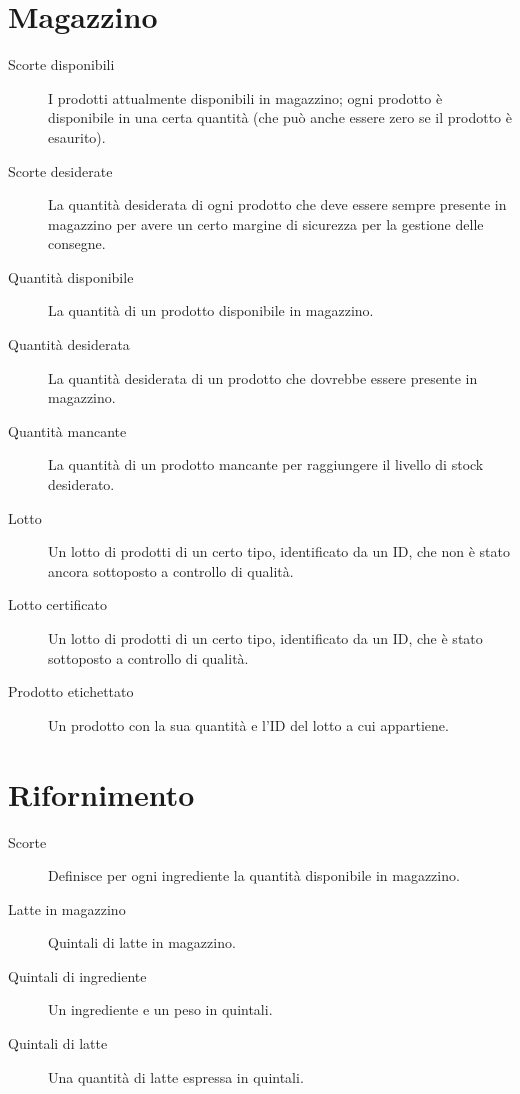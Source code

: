 \section{Magazzino}
\begin{description}
    \item [Scorte disponibili] I prodotti attualmente disponibili in magazzino; ogni prodotto è disponibile in una certa quantità (che può anche essere zero se il prodotto è esaurito).
    \item [Scorte desiderate] La quantità desiderata di ogni prodotto che deve essere sempre presente in magazzino per avere un certo margine di sicurezza per la gestione delle consegne.
    \item [Quantità disponibile] La quantità di un prodotto disponibile in magazzino.
    \item [Quantità desiderata] La quantità desiderata di un prodotto che dovrebbe essere presente in magazzino.
    \item [Quantità mancante] La quantità di un prodotto mancante per raggiungere il livello di stock desiderato.
    \item [Lotto] Un lotto di prodotti di un certo tipo, identificato da un ID, che non è stato ancora sottoposto a controllo di qualità.
    \item [Lotto certificato] Un lotto di prodotti di un certo tipo, identificato da un ID, che è stato sottoposto a controllo di qualità.
    \item [Prodotto etichettato] Un prodotto con la sua quantità e l'ID del lotto a cui appartiene.
\end{description}

\section{Rifornimento}
\begin{description}
    \item[Scorte] Definisce per ogni ingrediente la quantità disponibile in magazzino.
    \item[Latte in magazzino] Quintali di latte in magazzino.
    \item[Quintali di ingrediente] Un ingrediente e un peso in quintali.
    \item[Quintali di latte] Una quantità di latte espressa in quintali.
\end{description}

